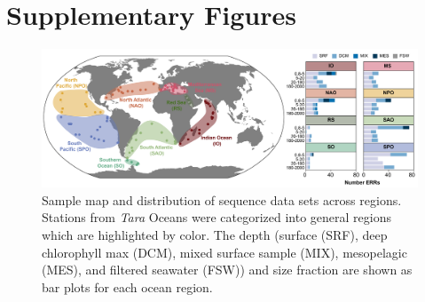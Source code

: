 \documentclass[12pt]{article}
\numberwithin{equation}{section}
\begin{document}
\section*{Supplementary Figures}

\begin{landscape}
\begin{figure}
    \centering
    \includegraphics[width=0.95\columnwidth]{si-figures/Tara_stationMap-01.png}
    \caption{Sample map and distribution of sequence data sets across regions. Stations from \textit{Tara} Oceans were categorized into general regions which are highlighted by color. The depth (surface (SRF), deep chlorophyll max (DCM), mixed surface sample (MIX), mesopelagic (MES), and filtered seawater (FSW)) and size fraction are shown as bar plots for each ocean region. }
    \label{fig:tara-map}
\end{figure}
\end{landscape}
\end{document}
